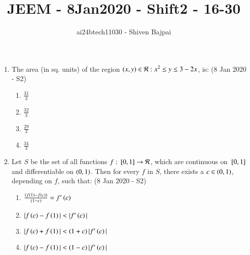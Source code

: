 \documentclass[journal]{IEEEtran}
\begin{document}
\onecolumn

\vspace{3cm}

\renewcommand{\thefigure}{\theenumi}
\renewcommand{\thetable}{\theenumi}

\title{JEEM - 8Jan2020 - Shift2 - 16-30}
\author{ai24btech11030 - Shiven Bajpai}
\maketitle

\begin{enumerate}
    \item The area (in sq. units) of the region ${\left(x,y\right) \in \mathcal{R} : x^2 \leq y \leq 3 - 2x}$, is: \hfill (8 Jan 2020 - S2)
    \begin{multicols}{4}
    \begin{enumerate}
        \item $\frac{31}{3}$
        \item $\frac{32}{3}$
        \item $\frac{29}{3}$
        \item $\frac{34}{3}$
    \end{enumerate}
    \end{multicols}
    
    \item Let $S$ be the set of all functions $f:{}\left[0,1\right] \rightarrow \mathcal{R}$, which are continuous on ${}\left[0, 1\right]$ and differentiable on $\left(0, 1\right)$. Then for every $f$ in $S$, there exists a $c \in \left(0,1\right)$, depending on $f$, such that: \hfill (8 Jan 2020 - S2)
    \begin{multicols}{2}
        \begin{enumerate}
            \item $\frac{\left(f\left(1\right)-f\left(c\right)\right)}{\left(1-c\right)} = f^\prime\left(c\right) $
            \item $|f\left(c\right) - f\left(1\right)| < |f^\prime\left(c\right)| $
            \columnbreak
            \item $|f\left(c\right) + f\left(1\right)| < \left(1 + c\right)|f ^\prime \left(c\right)| $
            \item $|f\left(c\right) - f\left(1\right)| < \left(1 - c\right)|f^\prime\left(c\right)|$
        \end{enumerate}
    \end{multicols}


\end{enumerate}
\end{document}
